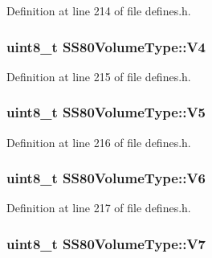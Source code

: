 Definition at line 214 of file defines.\+h.

\subsubsection[{\texorpdfstring{V4}{V4}}]{\setlength{\rightskip}{0pt plus 5cm}uint8\+\_\+t S\+S80\+Volume\+Type\+::\+V4}\hypertarget{structSS80VolumeType_af9d8bebf55fc497315218fe31308fb67}{}\label{structSS80VolumeType_af9d8bebf55fc497315218fe31308fb67}


Definition at line 215 of file defines.\+h.

\subsubsection[{\texorpdfstring{V5}{V5}}]{\setlength{\rightskip}{0pt plus 5cm}uint8\+\_\+t S\+S80\+Volume\+Type\+::\+V5}\hypertarget{structSS80VolumeType_a0dd8407a160f58905f93cedcf89c92a4}{}\label{structSS80VolumeType_a0dd8407a160f58905f93cedcf89c92a4}


Definition at line 216 of file defines.\+h.

\subsubsection[{\texorpdfstring{V6}{V6}}]{\setlength{\rightskip}{0pt plus 5cm}uint8\+\_\+t S\+S80\+Volume\+Type\+::\+V6}\hypertarget{structSS80VolumeType_ae75294f5cb3a30f1364b44ec67ae0efd}{}\label{structSS80VolumeType_ae75294f5cb3a30f1364b44ec67ae0efd}


Definition at line 217 of file defines.\+h.

\subsubsection[{\texorpdfstring{V7}{V7}}]{\setlength{\rightskip}{0pt plus 5cm}uint8\+\_\+t S\+S80\+Volume\+Type\+::\+V7}\hypertarget{structSS80VolumeType_ab3b5337987dc6c7806fc290a819c5c8c}{}\label{structSS80VolumeType_ab3b5337987dc6c7806fc290a819c5c8c}


